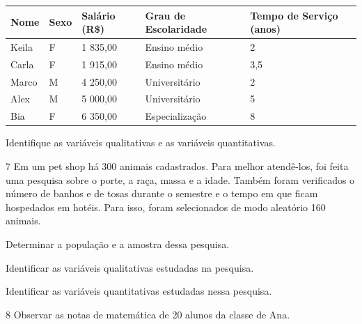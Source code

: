 \begin{longtable}[]{@{}lllll@{}}
\toprule
\textbf{Nome} & \textbf{Sexo} & \textbf{Salário (R\$)} & \textbf{Grau de
Escolaridade} & \textbf{Tempo de Serviço (anos)}\tabularnewline
\midrule
\endhead
Keila & F & 1 835,00 & Ensino médio & 2\tabularnewline
Carla & F & 1 915,00 & Ensino médio & 3,5\tabularnewline
Marco & M & 4 250,00 & Universitário & 2\tabularnewline
Alex & M & 5 000,00 & Universitário & 5\tabularnewline
Bia & F & 6 350,00 & Especialização & 8\tabularnewline
\bottomrule
\end{longtable}

Identifique as variáveis qualitativas e as variáveis quantitativas.


\num{7} Em um pet shop há 300 animais cadastrados. Para melhor atendê-los,
foi feita uma pesquisa sobre o porte, a raça, massa e a idade. Também
foram verificados o número de banhos e de tosas durante o semestre e o
tempo em que ficam hospedados em hotéis. Para isso, foram selecionados
de modo aleatório 160 animais.

\begin{escolha}
\item
  Determinar a população e a amostra dessa pesquisa.


\reduline{\mbox{}\hfill}

\reduline{\mbox{}\hfill}

\item
  Identificar as variáveis qualitativas estudadas na pesquisa.


\reduline{\mbox{}\hfill}

\reduline{\mbox{}\hfill}

\item
  Identificar as variáveis quantitativas estudadas nessa pesquisa.


\reduline{\mbox{}\hfill}

\reduline{\mbox{}\hfill}
\end{escolha}

\pagebreak
\num{8} Observar as notas de matemática de 20 alunos da classe de Ana.

